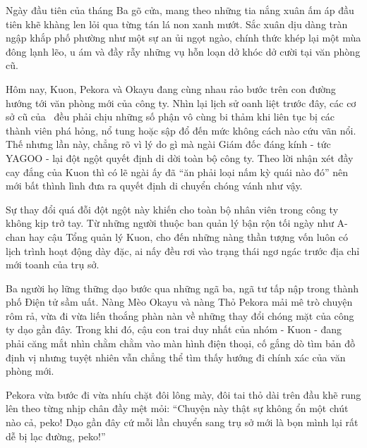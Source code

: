\documentclass[../main.tex]{subfiles}
\begin{document}

Ngày đầu tiên của tháng Ba gõ cửa, mang theo những tia nắng xuân ấm áp đầu tiên khẽ khàng len lỏi qua từng tán lá non xanh mướt. Sắc xuân dịu dàng tràn ngập khắp phố phường như một sự an ủi ngọt ngào, chính thức khép lại một mùa đông lạnh lẽo, u ám và đầy rẫy những vụ hỗn loạn dở khóc dở cười tại văn phòng cũ.

Hôm nay, Kuon, Pekora và Okayu đang cùng nhau rảo bước trên con đường hướng tới văn phòng mới của công ty. Nhìn lại lịch sử oanh liệt trước đây, các cơ sở cũ của \hll\ đều phải chịu những số phận vô cùng bi thảm khi liên tục bị các thành viên phá hỏng, nổ tung hoặc sập đổ đến mức không cách nào cứu vãn nổi. Thế nhưng lần này, chẳng rõ vì lý do gì mà ngài Giám đốc đáng kính - tức YAGOO - lại đột ngột quyết định di dời toàn bộ công ty. Theo lời nhận xét đầy cay đắng của Kuon thì có lẽ ngài ấy đã ``ăn phải loại nấm kỳ quái nào đó'' nên mới bất thình lình đưa ra quyết định di chuyển chóng vánh như vậy.

Sự thay đổi quá đỗi đột ngột này khiến cho toàn bộ nhân viên trong công ty không kịp trở tay. Từ những người thuộc ban quản lý bận rộn tối ngày như A-chan hay cậu Tổng quản lý Kuon, cho đến những nàng thần tượng vốn luôn có lịch trình hoạt động dày đặc, ai nấy đều rơi vào trạng thái ngơ ngác trước địa chỉ mới toanh của trụ sở.

Ba người họ lững thững dạo bước qua những ngã ba, ngã tư tấp nập trong thành phố Điện tử sầm uất. Nàng Mèo Okayu và nàng Thỏ Pekora mải mê trò chuyện rôm rả, vừa đi vừa liến thoắng phàn nàn về những thay đổi chóng mặt của công ty dạo gần đây. Trong khi đó, cậu con trai duy nhất của nhóm - Kuon - đang phải căng mắt nhìn chằm chằm vào màn hình điện thoại, cố gắng dò tìm bản đồ định vị nhưng tuyệt nhiên vẫn chẳng thể tìm thấy hướng đi chính xác của văn phòng mới.


Pekora vừa bước đi vừa nhíu chặt đôi lông mày, đôi tai thỏ dài trên đầu khẽ rung lên theo từng nhịp chân đầy mệt mỏi: ``Chuyện này thật sự không ổn một chút nào cả, peko! Dạo gần đây cứ mỗi lần chuyển sang trụ sở mới là bọn mình lại rất dễ bị lạc đường, peko!''
\end{document}
